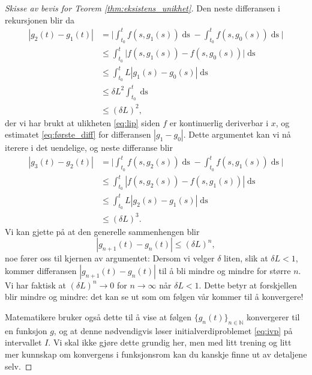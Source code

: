 \documentclass{article}
\theoremstyle{plain}
\theoremstyle{definition}
\theoremstyle{remark}
\newcommand{\diff}[1]{\mathop{d#1}}
\newcommand{\abs}[1]{|#1|}
\newcommand{\bigabs}[1]{\big|#1\big|}
\newcommand{\biggabs}[1]{\bigg|#1\bigg|}
\begin{document}
\begin{proof}[Skisse av bevis for Teorem \ref{thm:eksistens_unikhet}]
    Den neste differansen i rekursjonen blir da
    \begin{equation*}
        \begin{aligned}
            \abs{g_{2}(t) - g_1(t)} & = \biggabs{\int_{t_0}^{t} f(s, g_1(s)) \diff{s} - \int_{t_0}^{t} f(s, g_{0}(s)) \diff{s}} \\
            & \leq \int_{t_0}^{t} \bigabs{f(s, g_1(s)) - f(s, g_{0}(s))} \diff{s} \\
            & \leq \int_{t_0}^{t} L \abs{g_1(s) - g_{0}(s)} \diff{s} \\
            & \leq \delta L^2 \int_{t_0}^{t} \diff{s} \\
            & \leq (\delta L)^2,
        \end{aligned}
    \end{equation*}
    der vi har brukt at ulikheten \eqref{eq:lip} siden $f$ er kontinuerlig deriverbar i $x$, og estimatet \eqref{eq:første_diff} for differansen $\abs{g_1 - g_0}$. Dette argumentet kan vi nå iterere i det uendelige, og neste differanse blir
    \begin{equation*}
        \begin{aligned}
            \abs{g_{3}(t) - g_2(t)} & = \biggabs{\int_{t_0}^{t} f(s, g_2(s)) \diff{s} - \int_{t_0}^{t} f(s, g_{1}(s)) \diff{s}} \\
            & \leq \int_{t_0}^{t} \abs{f(s, g_2(s)) - f(s, g_{1}(s))} \diff{s} \\
            & \leq \int_{t_0}^{t} L \abs{g_2(s) - g_{1}(s)} \diff{s} \\
            & \leq (\delta L)^3.
        \end{aligned}
    \end{equation*}
    Vi kan gjette på at den generelle sammenhengen blir
    \begin{equation*}
        \abs{g_{n+1}(t) - g_n(t)} \leq (\delta L)^n,     
    \end{equation*}
    noe fører oss til kjernen av argumentet: Dersom vi velger $\delta$ liten, slik at $\delta L < 1$, kommer differansen $\abs{g_{n+1}(t) - g_n(t)}$ til å bli mindre og mindre for større $n$. Vi har faktisk at ${(\delta L)^n \rightarrow 0}$ for ${n \rightarrow \infty}$ når $\delta L < 1$. Dette betyr at forskjellen blir mindre og mindre: det kan se ut som om følgen vår kommer til å konvergere! 
    
    Matematikere bruker også dette til å vise at følgen $\{g_n(t)\}_{n \in \mathbb{N}}$ konvergerer til en funksjon $g$, og at denne nødvendigvis løser initialverdiproblemet \eqref{eq:ivp} på intervallet $I$. Vi skal ikke gjøre dette grundig her, men med litt trening og litt mer kunnskap om konvergens i funksjonsrom kan du kanskje finne ut av detaljene selv.
\end{proof}
\end{document}
